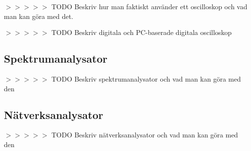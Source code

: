 $>>>>>$ TODO Beskriv hur man faktiskt använder ett oscilloskop och vad
man kan göra med det.

$>>>>>$ TODO Beskriv digitala och PC-baserade digitala oscilloskop

\subsection{Spektrumanalysator}

$>>>>>$ TODO Beskriv spektrumanalysator och vad man kan göra med den

\subsection{Nätverksanalysator}

$>>>>>$ TODO Beskriv nätverksanalysator och vad man kan göra med den
